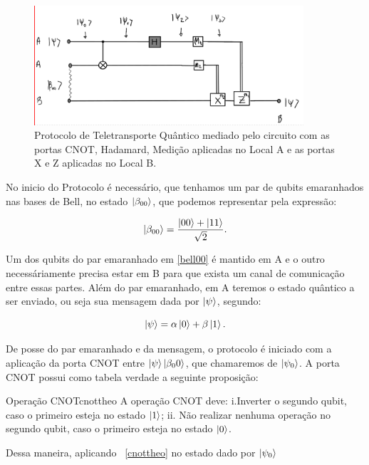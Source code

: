 \documentclass[11pt,oneside,brazil,hidelinks,article,sumario=tradicional,a4paper]{abntex2}
\begin{document}
\begin{figure}
\centering
\includegraphics[width=10cm]{PROTOCOLOTELETRANSPORTE.png}
\caption{Protocolo de Teletransporte Quântico mediado pelo circuito com as portas CNOT, Hadamard, Medição aplicadas no Local A e as portas X e Z aplicadas no Local B.}\label{protocoloteletransporte}
\end{figure}

No inicio do Protocolo é necessário, que tenhamos um par de qubits emaranhados nas bases de Bell, no estado $\ket{\beta_{00}}$, que podemos representar pela expressão:

\begin{equation}\label{bell00}
 \ket{\beta_{00}} = \frac{\ket{00} + \ket{11}} {\sqrt{2}}.
\end{equation}

Um dos qubits do par emaranhado em \ref{bell00} é mantido em A e o outro necessáriamente precisa estar em B para que exista um canal de comunicação entre essas partes. Além do par emaranhado, em A teremos o estado quântico a ser enviado, ou seja sua mensagem dada por $\ket{\psi}$, segundo:

\begin{equation}\label{psi}
 \ket{\psi} = \alpha \ket{0} + \beta \ket{1}.
\end{equation}

De posse do par emaranhado e da mensagem, o protocolo é iniciado com a aplicação da porta CNOT entre $\ket{\psi}\ket{\beta_00}$, que chamaremos de $\ket{\psi_0}$. A porta CNOT possui como tabela verdade a seguinte proposição:

\begin{theo}{Operação CNOT}{cnottheo}
A operação CNOT deve: i.Inverter o segundo qubit, caso o primeiro esteja no estado $\ket{1}$; ii. Não realizar nenhuma operação no segundo qubit, caso o primeiro esteja no estado $\ket{0}$.
\end{theo}

Dessa maneira, aplicando ~\ref{cnottheo} no estado dado por $\ket{\psi_0}$
\end{document}
